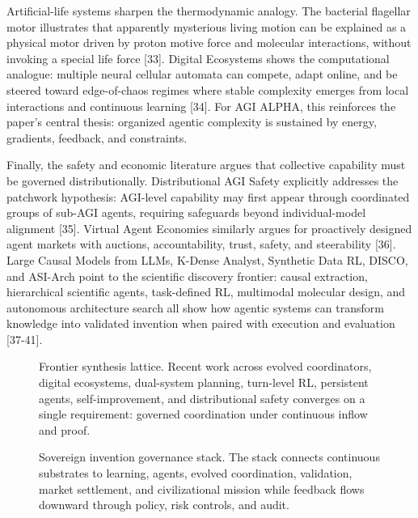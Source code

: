 \documentclass[
  11pt,
]{article}
\begin{document}
Artificial-life systems sharpen the thermodynamic analogy. The bacterial flagellar motor illustrates that apparently mysterious living motion can be explained as a physical motor driven by proton motive force and molecular interactions, without invoking a special life force [33]. Digital Ecosystems shows the computational analogue: multiple neural cellular automata can compete, adapt online, and be steered toward edge-of-chaos regimes where stable complexity emerges from local interactions and continuous learning [34]. For AGI ALPHA, this reinforces the paper's central thesis: organized agentic complexity is sustained by energy, gradients, feedback, and constraints.

Finally, the safety and economic literature argues that collective capability must be governed distributionally. Distributional AGI Safety explicitly addresses the patchwork hypothesis: AGI-level capability may first appear through coordinated groups of sub-AGI agents, requiring safeguards beyond individual-model alignment [35]. Virtual Agent Economies similarly argues for proactively designed agent markets with auctions, accountability, trust, safety, and steerability [36]. Large Causal Models from LLMs, K-Dense Analyst, Synthetic Data RL, DISCO, and ASI-Arch point to the scientific discovery frontier: causal extraction, hierarchical scientific agents, task-defined RL, multimodal molecular design, and autonomous architecture search all show how agentic systems can transform knowledge into validated invention when paired with execution and evaluation [37-41].

\begin{figure}[htbp]
\centering
\resizebox{0.96\textwidth}{!}{}
\caption{Frontier synthesis lattice. Recent work across evolved coordinators, digital ecosystems, dual-system planning, turn-level RL, persistent agents, self-improvement, and distributional safety converges on a single requirement: governed coordination under continuous inflow and proof.}
\end{figure}

\begin{figure}[htbp]
\centering
\resizebox{0.96\textwidth}{!}{}
\caption{Sovereign invention governance stack. The stack connects continuous substrates to learning, agents, evolved coordination, validation, market settlement, and civilizational mission while feedback flows downward through policy, risk controls, and audit.}
\end{figure}
\end{document}
